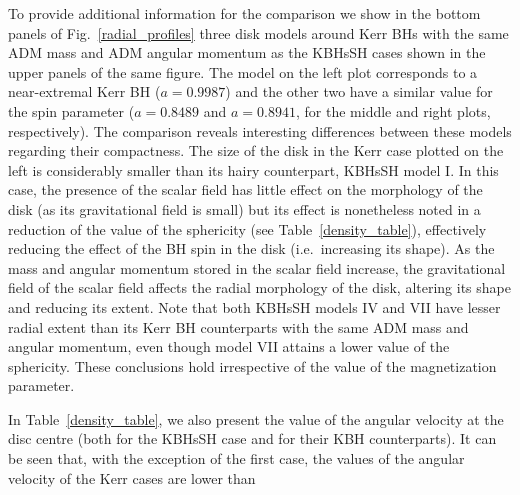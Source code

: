 \documentclass[twocolumn,aps,showpacs,showkeys,prd,superscriptaddress,byrevtex, amsmath]{revtex4-1}
\begin{document}
To provide additional information for the comparison we show in the bottom panels of Fig.~\ref{radial_profiles} three disk models around Kerr BHs  with the same ADM mass and ADM angular momentum as the KBHsSH cases shown in the upper panels of the same figure. The model on the left plot corresponds to a near-extremal Kerr BH ($a=0.9987$) and the other two have a similar value for the  spin parameter ($a=0.8489$ and $a=0.8941$, for the middle and right plots, respectively). The comparison reveals interesting differences between these models regarding their compactness. The size of the disk in the Kerr case plotted on the left is considerably smaller than its hairy counterpart, KBHsSH model I. In this case, the presence of the scalar field has little effect on the morphology of the disk (as its gravitational field is small) but its effect is nonetheless noted in a reduction of the value of the sphericity (see Table~\ref{density_table}), effectively reducing the effect of the BH spin in the disk (i.e.~increasing its shape). As the mass and angular momentum stored in the scalar field increase, the gravitational field of the scalar field affects the radial morphology of the disk, altering its shape and reducing its extent. Note that both KBHsSH models IV and VII have lesser radial extent than its Kerr BH counterparts with the same ADM mass and angular momentum, even though model VII attains a lower value of the sphericity. These conclusions hold irrespective of the value of the magnetization parameter.

In Table~\ref{density_table}, we also present the value of the angular velocity at the disc centre (both for the KBHsSH case and for their KBH counterparts). It can be seen that, with the exception of the first case, the values of the angular velocity of the Kerr cases are lower than   

\end{document}
